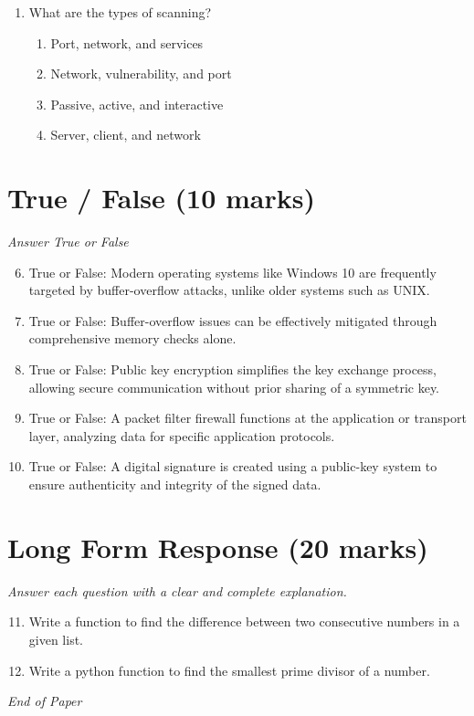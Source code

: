 \documentclass[12pt]{article}
\begin{document}
\begin{enumerate}[label=\arabic*.]
\begin{enumerate}[label=(\alph*)]
    \item Mishandling of undefined, poorly defined variables
    \item The Vulnerability that allows "fingerprinting" \& other enumeration of host information
    \item Overloading of transport-layer mechanisms
    \item Unauthorized network access
\end{enumerate}
\item What are the types of scanning?
\begin{enumerate}[label=(\alph*)]
    \item Port, network, and services
    \item Network, vulnerability, and port
    \item Passive, active, and interactive
    \item Server, client, and network
\end{enumerate}
\end{enumerate}

\section*{True / False (10 marks)}
\textit{Answer True or False}
\begin{enumerate}[label=\arabic*.]
\setcounter{enumi}{5}
\item True or False: Modern operating systems like Windows 10 are frequently targeted by buffer-overflow attacks, unlike older systems such as UNIX.
\item True or False: Buffer-overflow issues can be effectively mitigated through comprehensive memory checks alone.
\item True or False: Public key encryption simplifies the key exchange process, allowing secure communication without prior sharing of a symmetric key.
\item True or False: A packet filter firewall functions at the application or transport layer, analyzing data for specific application protocols.
\item True or False: A digital signature is created using a public-key system to ensure authenticity and integrity of the signed data.
\end{enumerate}

\section*{Long Form Response (20 marks)}
\textit{Answer each question with a clear and complete explanation.}
\begin{enumerate}[label=\arabic*.]
\setcounter{enumi}{10}
\item Write a function to find the difference between two consecutive numbers in a given list.
\item Write a python function to find the smallest prime divisor of a number.
\end{enumerate}

\vfill
\noindent\textit{End of Paper}
\end{document}

